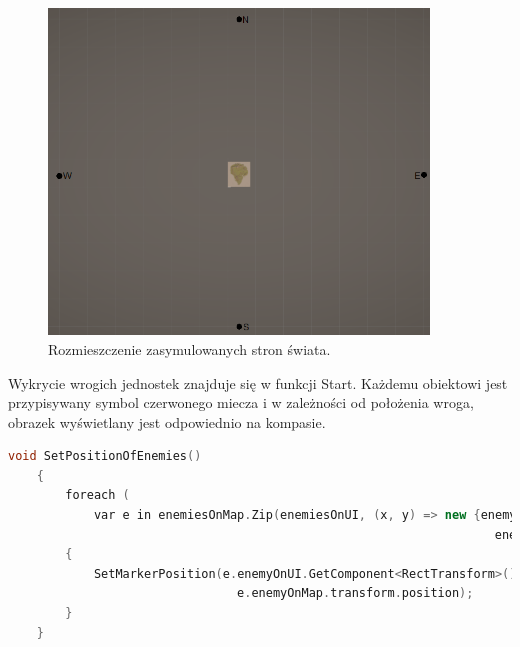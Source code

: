 \begin{figure}[htbp]
    \centering
    \includegraphics[width=0.9\textwidth]{images/ui/strony_swiata.png}
    \caption{Rozmieszczenie zasymulowanych stron świata.}\label{fig:world_sides}
\end{figure}
\FloatBarrier
Wykrycie wrogich jednostek znajduje się w funkcji Start. Każdemu obiektowi jest przypisywany symbol czerwonego miecza i w zależności od położenia wroga, obrazek wyświetlany jest odpowiednio na kompasie.
\begin{lstlisting}[language=C++, caption=Fragment kodu odpowiedzialny za połączenie wrogich obiektów na mapie z symbolami wyświetlonymi na kompasie]
    void SetPositionOfEnemies()
    {
        foreach (
            var e in enemiesOnMap.Zip(enemiesOnUI, (x, y) => new {enemyOnMap = x, 
                                                                    enemyOnUI = y }))
        {
            SetMarkerPosition(e.enemyOnUI.GetComponent<RectTransform>(), 
                                e.enemyOnMap.transform.position);
        }
    }
\end{lstlisting}
